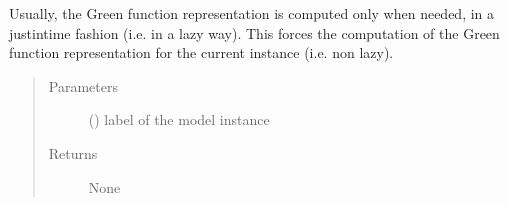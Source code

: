 \documentclass[letterpaper,10pt,english]{sphinxmanual}
\begin{document}

\begin{fulllineitems}
\label{\detokenize{functions:pyqcm.Green_function_solve}}
\sphinxAtStartPar
Usually, the Green function representation is computed only when needed, in a just\sphinxhyphen{}in\sphinxhyphen{}time fashion (i.e. in a lazy way).
This forces the computation of the Green function representation for the current instance (i.e. non lazy).
\begin{quote}\begin{description}
\item[{Parameters}] \leavevmode
\sphinxAtStartPar
{} () \textendash{} label of the model instance

\item[{Returns}] \leavevmode
\sphinxAtStartPar
None

\end{description}\end{quote}

\end{fulllineitems}

\end{document}
